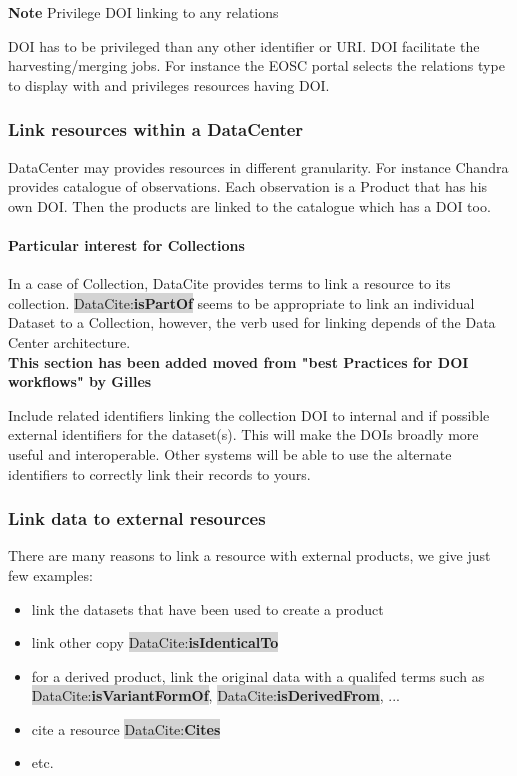 \documentclass[11pt,a4paper]{ivoa}
\newcommand{\dataciteterm}[1]{\colorbox{lightgray}{DataCite:\textbf{#1}}}
\newcommand{\important}[1]{
	\begin{bigdescription}
		\item \color{ivoacolor}\textbf{Note} #1
	\end{bigdescription}
}
\begin{document}
\important{Privilege DOI linking to any relations}

DOI has to be privileged than any other identifier or URI. DOI facilitate the harvesting/merging jobs. For instance the EOSC portal selects the relations type to display with and privileges resources having DOI.

\subsubsection{Link resources within a DataCenter}
DataCenter may provides resources in different granularity. For instance Chandra provides catalogue of observations. Each observation is a Product that has his own DOI.
Then the products are linked to the catalogue which has a DOI too.

\paragraph{Particular interest for Collections}
In a case of Collection, DataCite provides terms to link a resource  to its collection. 
\dataciteterm{isPartOf}  seems to be appropriate to link an individual Dataset to a Collection, however, the verb used for linking depends of the Data Center architecture. \\

\textbf{\color{red}This section has been added moved from "best Practices for DOI workflows"  by Gilles }


Include related identifiers linking the collection DOI to internal and if possible external identifiers for the dataset(s). 
This will make the DOIs broadly more useful and interoperable.
Other systems will be able to use the alternate identifiers to correctly link their records to yours.


\subsubsection{Link data to external resources}
There are many reasons to link a resource with external products, we give just few examples:

\begin{itemize}
	\item link the datasets that have been used to create a product 
	\item link other copy \dataciteterm{isIdenticalTo}
	\item for a derived product, link the original data with a qualifed terms such as \dataciteterm{isVariantFormOf}, \dataciteterm{isDerivedFrom}, ...
	\item cite a resource \dataciteterm{Cites}
	\item etc.
\end{itemize}
\end{document}
